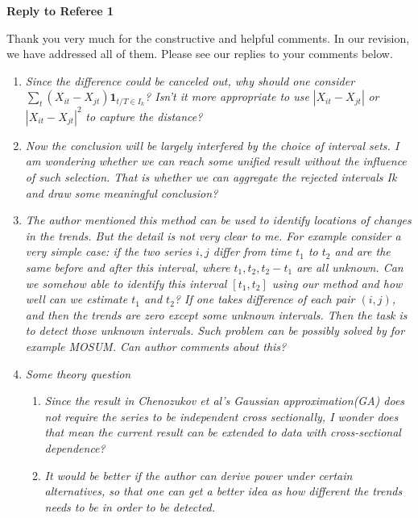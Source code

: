 \documentclass[a4paper,12pt]{article}
\begin{document}
\newpage
\begin{center}
{\large \bf Reply to Referee 1} 
\end{center}


Thank you very much for the constructive and helpful comments. In our revision, we have addressed all of them. Please see our replies to your comments below.


\begin{enumerate}[label=(\arabic*),leftmargin=0.7cm]

\item \textit{Since the difference could be canceled out, why should one consider} $\sum\nolimits_t (X_{it} - X_{jt})\mathbf{1}_{t/T \in I_k}$\textit{? Isn't it more appropriate to use} $|X_{it} - X_{jt}|$ \textit{ or } $|X_{it} - X_{jt}|^2$ \textit{to capture the distance?}


\item \textit{Now the conclusion will be largely interfered by the choice of interval sets. I am wondering whether we can reach some unified result without the influence of such selection. That is whether we can aggregate the rejected intervals Ik and draw some meaningful conclusion?}

\item \textit{The author mentioned this method can be used to identify locations of changes in the trends. But the detail is not very clear to me. For example consider a very simple case: if the two series $i, j$ differ from time $t_1$ to $t_2$ and are the same before and after this interval, where $t_1, t_2, t_2 - t_1$ are all unknown. Can we somehow able to identify this interval $[t_1, t_2]$ using our method and how well can we estimate $t_1$ and $t_2$? If one takes difference of each pair $(i, j)$, and then the trends are zero except some unknown intervals. Then the task is to detect those unknown intervals. Such problem can be possibly solved by for example MOSUM. Can author comments about this?}

\item \textit{Some theory question}

\begin{enumerate}[label=(\roman*)]
\item \textit{Since the result in Chenozukov et al's Gaussian approximation(GA) does not require the series to be independent cross sectionally, I wonder does that mean the current result can be extended to data with cross-sectional dependence?}
\item \textit{It would be better if the author can derive power under certain alternatives, so that one can get a better idea as how different the trends needs to be in order to be detected.}


\end{enumerate}
\end{enumerate}
\end{document}
